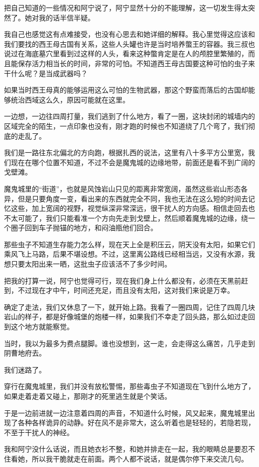 把自己知道的一些情况和阿宁说了，阿宁显然十分的不能理解，这一切发生得太突然了。她对我的话半信半疑。

我自己也感觉这有点难接受，也没有心思去和她详细的解释。我心里觉得这应该和我们要找的西王母古国有关系，这些人头罐也许是当时培养蟞王的容器。我三叔也说过在海底墓穴里看到过这样的人头，看来这种蟞肯定是在人的颅腔里繁殖的，而且能保存活力相当长的时间，非常的可怕。不知道西王母古国要这种可怕的虫子来干什么呢？是当成武器吗？

如果当时西王母真的能够运用这么可怕的生物武器，那这个野蛮而落后的古国却能够统治西域这么久，原因可能就在这里。

一边想，一边往四周打量，我们逃到了什么地方，看了一圈，这块封闭的城墙内的区域完全的陌生，一点印象也没有，刚才跑的时候也不知道绕了几个弯了，我们彻底的走乱了。

我们是一路往东北偏北的方向跑，根据扎西的说法，这里有八十多平方公里宽，我们现在在哪个位置不知道，不过不会是魔鬼城的边缘地带，前面还是看不到广阔的戈壁滩。

魔鬼城里的“街道”，也就是风蚀岩山只见的距离非常宽阔，虽然这些岩山形态各异，但是只要角度一变，看出来的东西就完全不同，我也无法在这么短的时间去记忆这些，加上宽阔的视野，视觉纵深非常深远，很干扰人的方向感。相信走回去也不太可能了，我们只能看准一个方向先走到戈壁上，然后顺着魔鬼城的边缘，绕一个圈子回到车子抛锚的地方，和闷油瓶他们回合。

那些虫子不知道生存能力怎么样，现在天上全是积压云，阴天没有太阳，如果它们乘风飞上马路，后果不堪设想。不过，这里离公路线已经相当远，又没有水源，我想只要太阳出来一晒，这批虫子应该活不了多少时间。

把我的打算一说，阿宁也觉得可行，现在我们身上什么都没有，必须在天黑前赶到，不过现在才中午，时间还充足，而且没有太阳，这对我们来说是万幸。

确定了走法，我们又休息了一下，就开始上路。我看了一圈四周，记住了四周几块岩山的样子，都是好像城堡的炮楼一样，如果我们不幸走了回头路，那么如过走回到这个地方就能察觉。

当时，我以为最多为费点腿脚。谁也没想到，这一走，会走得这么痛苦，几乎走到阴曹地府去。

我们迷路了。

穿行在魔鬼城里，我们并没有放松警惕，那些毒虫子不知道现在飞到什么地方了，如果走着走着又碰上，那刚才的死里逃生就是个笑话。

于是一边前进就一边注意着四周的声音，不知道什么时候，风又起来，魔鬼城里出现了各种各样诡异的动静。好在风不是非常大，这么听着也是轻轻的，若隐若现，不至于干扰人的神经。

我和阿宁没什么话说，而且她衣衫不整，和她并排走在一起，我的眼睛总是要忍不住看她，所以我干脆就走在前面。两个人都不说话，就是偶尔停下来交流几句。

